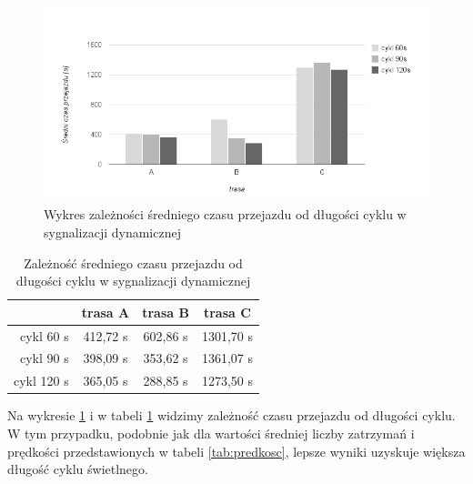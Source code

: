 \FloatBarrier
\begin{figure}[h]
    \centering
    \includegraphics[width=1.0\textwidth]{images/wykres_dlugosc_cyklu_czas.png}
    \caption{Wykres zależności średniego czasu przejazdu od długości cyklu w sygnalizacji dynamicznej}
    \label{fig:wykres_dlugosc_cyklu_czas}
\end{figure}
\FloatBarrier
\begin{table}[h]
	\centering
	\begin{tabular}{ |r|c|c|c| }
		\hline
		& trasa A & trasa B & trasa C \\
		\hline
		cykl 60 s & 412,72 s & 602,86 s & 1301,70 s \\
		\hline
		cykl 90 s & 398,09 s & 353,62 s & 1361,07 s \\
		\hline
		cykl 120 s & 365,05 s & 288,85 s & 1273,50 s \\
		\hline
	\end{tabular}
	\caption{Zależność średniego czasu przejazdu od długości cyklu w sygnalizacji dynamicznej}
	\label{tab:wykres_dlugosc_cyklu_czas}
\end{table}
\FloatBarrier
Na wykresie \ref{fig:wykres_dlugosc_cyklu_czas} i w tabeli \ref{tab:wykres_dlugosc_cyklu_czas} widzimy zależność czasu przejazdu od długości cyklu. W tym przypadku, podobnie jak dla wartości średniej liczby zatrzymań i prędkości przedstawionych w tabeli \ref{tab:predkosc}, lepsze wyniki uzyskuje większa długość cyklu świetlnego.

